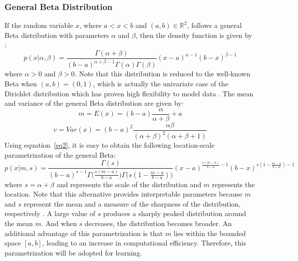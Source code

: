 \documentclass[journal,10pt]{elsart}
\begin{document}
\subsubsection{General Beta Distribution}
If the random variable $x$, where $a<x<b$ and $(a,b) \in \mathbb{R}^2$, follows a general Beta distribution with parameters $\alpha$ and $\beta$, then
the density function is given by \cite{Kotz1995}:
\begin{equation}\label{eq1}
p(x|\alpha,\beta)=\frac{\Gamma(\alpha+\beta)}{(b-a)^{\alpha+\beta-1}\Gamma(\alpha)\Gamma(\beta)}(x-a)^{\alpha-1}(b-x)^{\beta-1}
\end{equation}
where $\alpha > 0$ and $\beta > 0$. Note that this distribution is reduced to the well-known Beta when $(a,b)=(0,1)$, which is actually the univariate case of the Dirichlet distribution which has proven high flexibility to model data
\cite{BouguilaIEEETIP2004}. The mean and variance of the general Beta distribution are given by:
\begin{equation}\label{eq2}
m=E(x)=(b-a)\frac{\alpha}{\alpha+\beta}+a
\end{equation}
\begin{equation}\label{variance}
v=Var(x)=(b-a)^2\frac{\alpha\beta}{(\alpha+\beta)^2(\alpha+\beta+1)}
\end{equation}
Using equation~\ref{eq2}, it is easy to obtain the following location-scale parametrization of the general Beta:
\begin{equation}
p(x|m,s)=\frac{\Gamma(s)}{(b-a)^{s-1}\Gamma\big(\frac{s(m-a)}{b-a}\big)\Gamma\big(s(1-\frac{m-a}{b-a})\big)}(x-a)^{\frac{s(m-a)}{b-a}-1}(b-x)^{s(1-\frac{m-a}{b-a})-1}
\end{equation}
where $s=\alpha+\beta$ and represents the scale of the distribution and $m$ represents the location. Note that this alternative
provides interpretable parameters because $m$ and $s$
represent the mean and a measure of the sharpness of the distribution,
respectively \cite{MacKay1994}. A large value of $s$
produces a sharply peaked distribution around the mean $m$.
And when $s$ decreases, the distribution becomes
broader. An additional advantage of this
parametrization is that $m$ lies within the bounded
space $[a,b]$, leading to an increase in computational efficiency. Therefore, this
parametrization will be adopted for learning.
\end{document}
